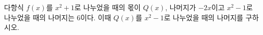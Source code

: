 다항식 $f(x)$를 $x^2+1$로 나누었을 때의 몫이 $Q(x)$, 나머지가 $-2x$이고 $x^2-1$로 나누었을 때의 나머지는 $6$이다. 이때 $Q(x)$를 $x^2-1$로 나누었을 때의 나머지를 구하시오.
